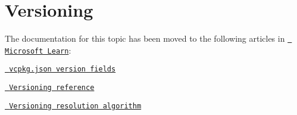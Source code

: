 \chapter{Versioning}
\hypertarget{md_external_2reflect-cpp_2vcpkg_2docs_2users_2versioning}{}\label{md_external_2reflect-cpp_2vcpkg_2docs_2users_2versioning}
\label{md_external_2reflect-cpp_2vcpkg_2docs_2users_2versioning_autotoc_md762}%
%


The documentation for this topic has been moved to the following articles in \href{https://learn.microsoft.com/vcpkg}{\texttt{ Microsoft Learn}}\+:


\begin{DoxyItemize}
\item \href{https://learn.microsoft.com/vcpkg/reference/vcpkg-json\#version}{\texttt{ vcpkg.\+json version fields}}
\item \href{https://learn.microsoft.com/vcpkg/users/versioning}{\texttt{ Versioning reference}}
\item \href{https://learn.microsoft.com/vcpkg/users/versioning.concepts}{\texttt{ Versioning resolution algorithm}} 
\end{DoxyItemize}